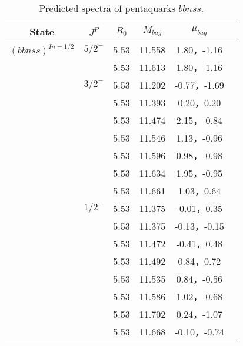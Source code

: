 \documentclass[prd,twocolumn,floatfix,nofootinbib]{revtex4}
\begin{document}
 \begin{table*}[!htbp]
    \caption{Predicted spectra of pentaquarks $bbns\bar{s}$.}
    \begin{tabular}{cccccc}
        \hline\hline
  {\rm State} &$J^{P}$ &$R_{0}$ &$M_{bag}$ &$\mu_{bag}$  \\ \hline
   ${(bbns\bar{s})}^{I{n}=1/2}$
            &${5/2}^{-}$     &5.53   &11.558 &1.80，-1.16  \\
                         &$ $     &5.53   &11.613 &1.80，-1.16  \\
            &${3/2}^{-}$     &5.53   &11.202 &-0.77，-1.69 \\
                         &$ $     &5.53   &11.393 &0.20，0.20  \\
                         &$ $     &5.53   &11.474 &2.15，-0.84  \\
                         &$ $     &5.53   &11.546 &1.13，-0.96 \\
                         &$ $     &5.53   &11.596 &0.98，-0.98  \\
                         &$ $     &5.53   &11.634 &1.95，-0.95  \\
                         &$ $     &5.53   &11.661 &1.03，0.64  \\
            &${1/2}^{-}$     &5.53   &11.375 &-0.01，0.35  \\
                         &$ $     &5.53   &11.375 &-0.13，-0.15  \\
                         &$ $     &5.53   &11.472 &-0.41，0.48  \\
                         &$ $     &5.53   &11.492 &0.84，0.72  \\
                         &$ $     &5.53   &11.535 &0.84，-0.56  \\
                         &$ $     &5.53   &11.586 &1.02，-0.68  \\
                         &$ $     &5.53   &11.702 &0.24，-1.07  \\
                         &$ $     &5.53   &11.668 &-0.10，-0.74  \\
        \hline\hline
    \end{tabular}
\end{table*}
\end{document}
